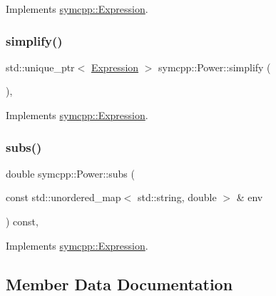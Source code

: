 Implements \mbox{\hyperlink{classsymcpp_1_1Expression_af37e13032a40f2da4d2866eaa8658049}{symcpp\+::\+Expression}}.

\mbox{\label{classsymcpp_1_1Power_aa6411b410decc9778640feaa7d173349}} 
\subsubsection{\texorpdfstring{simplify()}{simplify()}}
{\footnotesize\ttfamily std\+::unique\+\_\+ptr$<$ \mbox{\hyperlink{classsymcpp_1_1Expression}{Expression}} $>$ symcpp\+::\+Power\+::simplify (\begin{DoxyParamCaption}{ }\end{DoxyParamCaption})\hspace{0.3cm}{\ttfamily [override]}, {\ttfamily [virtual]}}



Implements \mbox{\hyperlink{classsymcpp_1_1Expression_ab1fa6e55eea0682250d013f28db26cd2}{symcpp\+::\+Expression}}.

\mbox{\label{classsymcpp_1_1Power_a0cf64595eca511f6a83317f47754bd58}} 
\subsubsection{\texorpdfstring{subs()}{subs()}}
{\footnotesize\ttfamily double symcpp\+::\+Power\+::subs (\begin{DoxyParamCaption}\item[{const std\+::unordered\+\_\+map$<$ std\+::string, double $>$ \&}]{env }\end{DoxyParamCaption}) const\hspace{0.3cm}{\ttfamily [override]}, {\ttfamily [virtual]}}



Implements \mbox{\hyperlink{classsymcpp_1_1Expression_aaef29b0afa2d6c21fe35f47a1be76134}{symcpp\+::\+Expression}}.



\subsection{Member Data Documentation}
\mbox{\label{classsymcpp_1_1Power_aa36a8b5499b378ec9bd705ea9a9e77ce}} 
